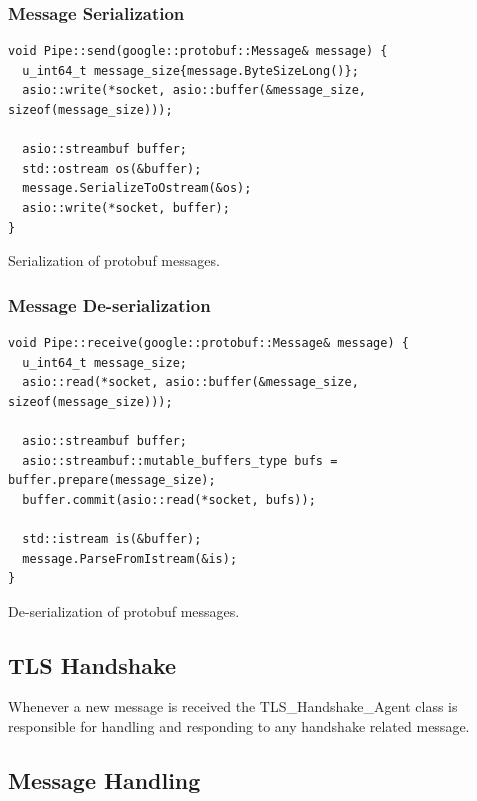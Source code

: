 \documentclass[12pt, letterpaper]{article}
\newenvironment{code}{\captionsetup{type=listing}}{}
\begin{document}
\subsubsection{Message Serialization}
\begin{code}
	\begin{verbatim}
void Pipe::send(google::protobuf::Message& message) {
  u_int64_t message_size{message.ByteSizeLong()};
  asio::write(*socket, asio::buffer(&message_size, sizeof(message_size)));
	
  asio::streambuf buffer;
  std::ostream os(&buffer);
  message.SerializeToOstream(&os);
  asio::write(*socket, buffer);
}
	\end{verbatim}
	\caption{Serialization of protobuf messages.}
	\label{pipeSend}
\end{code}

\subsubsection{Message De-serialization}
\begin{code}
	\begin{verbatim}
void Pipe::receive(google::protobuf::Message& message) {
  u_int64_t message_size;
  asio::read(*socket, asio::buffer(&message_size, sizeof(message_size)));
	
  asio::streambuf buffer;
  asio::streambuf::mutable_buffers_type bufs = buffer.prepare(message_size);
  buffer.commit(asio::read(*socket, bufs));
	
  std::istream is(&buffer);
  message.ParseFromIstream(&is);
}
	\end{verbatim}
	\caption{De-serialization of protobuf messages.}
	\label{pipeReceive}
\end{code}

\pagebreak

\subsection{TLS Handshake}
Whenever a new message is received the TLS\_Handshake\_Agent class is responsible for handling and responding to any handshake related message.

\subsection{Message Handling}
\end{document}
